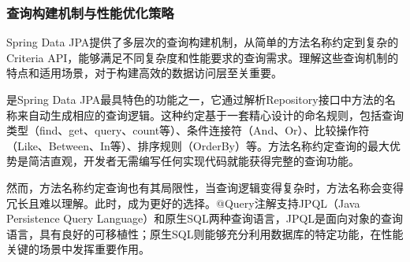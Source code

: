\hypertarget{ux67e5ux8be2ux6784ux5efaux673aux5236ux4e0eux6027ux80fdux4f18ux5316ux7b56ux7565}{%
\subsubsection{查询构建机制与性能优化策略}\label{ux67e5ux8be2ux6784ux5efaux673aux5236ux4e0eux6027ux80fdux4f18ux5316ux7b56ux7565}}

Spring Data JPA提供了多层次的查询构建机制，从简单的方法名称约定到复杂的Criteria API，能够满足不同复杂度和性能要求的查询需求。理解这些查询机制的特点和适用场景，对于构建高效的数据访问层至关重要。

是Spring Data JPA最具特色的功能之一，它通过解析Repository接口中方法的名称来自动生成相应的查询逻辑。这种约定基于一套精心设计的命名规则，包括查询类型（find、get、query、count等）、条件连接符（And、Or）、比较操作符（Like、Between、In等）、排序规则（OrderBy）等。方法名称约定查询的最大优势是简洁直观，开发者无需编写任何实现代码就能获得完整的查询功能。

然而，方法名称约定查询也有其局限性，当查询逻辑变得复杂时，方法名称会变得冗长且难以理解。此时，成为更好的选择。@Query注解支持JPQL（Java Persistence Query Language）和原生SQL两种查询语言，JPQL是面向对象的查询语言，具有良好的可移植性；原生SQL则能够充分利用数据库的特定功能，在性能关键的场景中发挥重要作用。

